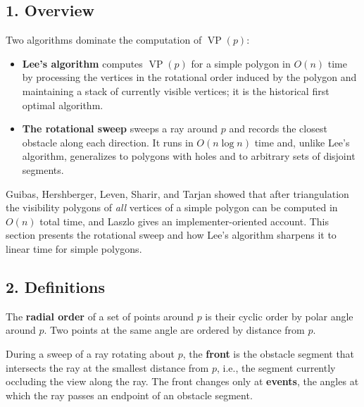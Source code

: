 \subsection{1. Overview}

Two algorithms dominate the computation of $\operatorname{VP}(p)$:
\begin{itemize}
  \item \textbf{Lee's algorithm} \cite{lee1983} computes
    $\operatorname{VP}(p)$ for a simple polygon in $O(n)$ time by processing
    the vertices in the rotational order induced by the polygon and
    maintaining a stack of currently visible vertices; it is the historical
    first optimal algorithm.
  \item \textbf{The rotational sweep} sweeps a ray around $p$ and records
    the closest obstacle along each direction. It runs in $O(n \log n)$
    time and, unlike Lee's algorithm, generalizes to polygons with holes and
    to arbitrary sets of disjoint segments.
\end{itemize}
Guibas, Hershberger, Leven, Sharir, and Tarjan \cite{guibas1987vis} showed
that after triangulation the visibility polygons of \emph{all} vertices of a
simple polygon can be computed in $O(n)$ total time, and Laszlo
\cite{laszlo1996} gives an implementer-oriented account. This section
presents the rotational sweep and how Lee's algorithm sharpens it to linear
time for simple polygons.

\subsection{2. Definitions}

\begin{definition}\label{def:vis_radial_order}
  The \textbf{radial order} of a set of points around $p$ is their cyclic
  order by polar angle around $p$. Two points at the same angle are ordered
  by distance from $p$.
\end{definition}

\begin{definition}[Front]\label{def:vis_front}
  During a sweep of a ray rotating about $p$, the \textbf{front} is the
  obstacle segment that intersects the ray at the smallest distance from $p$,
  i.e., the segment currently occluding the view along the ray. The front
  changes only at \textbf{events}, the angles at which the ray passes an
  endpoint of an obstacle segment.
\end{definition}

